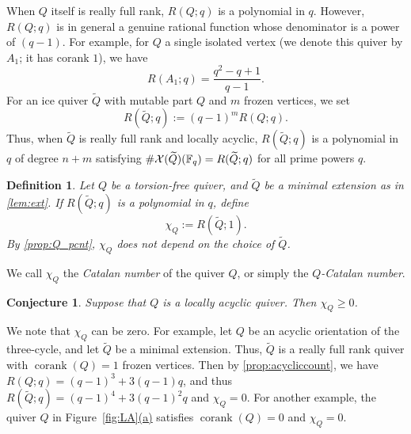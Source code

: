 \documentclass[11pt]{article}
\newtheorem{definition}[theo]{Definition}
\newtheorem{conjecture}[theo]{Conjecture}
\theoremstyle{definition}
\numberwithin{equation}{section}
\newcommand\cork{ \operatorname{corank}}
\newcommand\Qice{\widetilde{Q}}
\def\RQ(#1){R(Q;#1)}
\def\RQX#1#2{R(#1;#2)}
\def\RQice(#1){R(\Qice;#1)}
\newcommand\F{\mathbb{F}}
\newcommand\XQice{\Xcal(\Qice)}
\newcommand\chiQ{\chi_Q}
\def\figref#1(#2){Figure~\hyperref[#1]{\ref*{#1}(#2)}}
\newcommand\Louise{locally acyclic\xspace}
\begin{document}
When $Q$ itself is really full rank, $\RQ(q)$ is a polynomial in $q$. However, $\RQ(q)$ is in general a genuine rational function whose denominator is a power of $(q-1)$. For example, for $Q$ a single isolated vertex (we denote this quiver by $A_1$; it has corank $1$), we have
\begin{equation}\label{eq:A1}
  \RQX{A_1}{q}=\frac{q^2-q+1}{q-1}.
\end{equation}
For an ice quiver $\Qice$ with mutable part $Q$ and $m$ frozen vertices, we set
\begin{equation*}%
  \RQice(q):=(q-1)^m\RQ(q).
\end{equation*}
Thus, when $\Qice$ is really full rank and \Louise, $\RQice(q)$ is a polynomial in $q$ of degree $n+m$ satisfying $\#\XQice(\F_q)=\RQice(q)$ for all prime powers $q$.
\begin{definition}\label{def:QCat}
Let $Q$ be a torsion-free quiver, and $\Qice$ be a minimal extension as in \cref{lem:ext}.  If $\RQice(q)$ is a polynomial in $q$, define %
  \begin{equation*}%
    \chiQ:=\RQice(1).
  \end{equation*}
  By \cref{prop:Q_pcnt}, $\chiQ$ does not depend on the choice of $\Qice$.
\end{definition}
We call $\chiQ$ the \emph{Catalan number} of the quiver $Q$, or simply the \emph{$Q$-Catalan number}.

\begin{conjecture}\label{conj:Catalan}
Suppose that $Q$ is a \Louise quiver. %
Then $\chiQ \geq0$. %
\end{conjecture}
%

We note that $\chiQ$ can be zero.  For example, let $Q$ be an acyclic orientation of the three-cycle, and let $\Qice$ be a minimal extension. Thus, $\Qice$ is a really full rank quiver with $\cork(Q)=1$ frozen vertices.
%
 Then by \cref{prop:acycliccount}, we have $R(Q;q)=(q-1)^3+3(q-1)q$, and thus $R(\Qice;q) = (q-1)^4+3(q-1)^2q$ and  $\chiQ =0$.  For another example, the quiver $Q$ in \figref{fig:LA}(a) satisfies $\cork(Q) = 0$ and $\chiQ = 0$.  %
\end{document}
